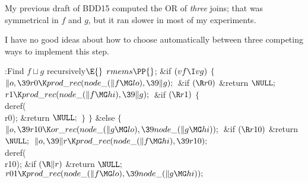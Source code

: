 My previous draft of {\mc BDD15}
computed the {\mc OR} of {\it three\/} joins; that was symmetrical
in $f$ and $g$, but it ran slower in most of my experiments.

I have no good ideas about how to choose automatically between three competing
ways to implement this step.

\Y\B\4:Find $f\sqcup g$ recursively\X${}\E{}$\6
$\\{rmems}\PP{}$;\6
\&{if} ${}(\\{vf}\I\\{vg}){}$\5
${}\{{}$\1\6
${}\|o,\39\\{r0}\K\\{prod\_rec}(\\{node\_}(\|f\MG\\{lo}),\39\|g);{}$\6
\&{if} ${}(\R\\{r0}){}$\1\5
\&{return} ${}\NULL;{}$\2\6
${}\\{r1}\K\\{prod\_rec}(\\{node\_}(\|f\MG\\{hi}),\39\|g);{}$\6
\&{if} ${}(\R\\{r1}){}$\5
${}\{{}$\1\6
\\{deref}(\\{r0});\6
\&{return} ${}\NULL;{}$\6
\4${}\}{}$\2\6
\4${}\}{}$\5
\2\&{else}\5
${}\{{}$\1\6
${}\|o,\39\\{r10}\K\\{or\_rec}(\\{node\_}(\|g\MG\\{lo}),\39\\{node\_}(\|g\MG%
\\{hi}));{}$\6
\&{if} ${}(\R\\{r10}){}$\1\5
\&{return} ${}\NULL;{}$\2\6
${}\|o,\39\|r\K\\{prod\_rec}(\\{node\_}(\|f\MG\\{hi}),\39\\{r10});{}$\6
\\{deref}(\\{r10});\6
\&{if} ${}(\R\|r){}$\1\5
\&{return} ${}\NULL;{}$\2\6
${}\\{r01}\K\\{prod\_rec}(\\{node\_}(\|f\MG\\{lo}),\39\\{node\_}(\|g\MG%
\\{hi}));{}$\6
